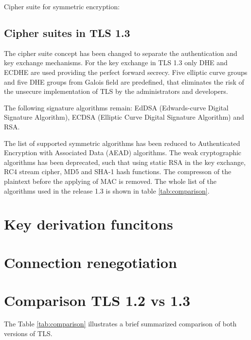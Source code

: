 Cipher suite for symmetric encryption:



\subsection{Cipher suites in TLS 1.3}
\label{subsec:ciphersuits1_3}

The cipher suite concept has been changed to separate the authentication and key exchange mechanisms.
For the key exchange in TLS 1.3 only DHE and ECDHE are used providing the perfect forward secrecy. Five elliptic curve groups and five DHE groups from Galois field are predefined, that eliminates the risk of the unsecure implementation of TLS by the administrators and developers.

The following signature algorithms remain: EdDSA (Edwards-curve Digital Signature Algorithm),
ECDSA (Elliptic Curve Digital Signature Algorithm) and RSA.

The list of supported symmetric algorithms has been reduced to Authenticated Encryption with Associated Data (AEAD) algorithms.
The weak cryptographic algorithms has been deprecated, such that using static RSA in the key exchange, RC4 stream cipher, MD5 and SHA-1 hash functions. The compresson of the plaintext before the applying of MAC is removed.
The whole list of the algorithms used in the release 1.3 is shown in table \ref{tab:comparison}.
\cite{recorla}
\section{Key derivation funcitons}
\label{sec:comparison_kdf}

\section{Connection renegotiation}
\label{sec:comparison_renegotiation}

\section{Comparison TLS 1.2 vs 1.3}
\label{sec:comparison}

The Table \ref{tab:comparison} illustrates a brief summarized comparison of both versions of TLS.

